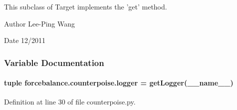 This subclass of Target implements the 'get' method.

\begin{DoxyAuthor}{Author}
Lee-\/\-Ping Wang 
\end{DoxyAuthor}
\begin{DoxyDate}{Date}
12/2011 
\end{DoxyDate}


\subsubsection{Variable Documentation}
\hypertarget{namespaceforcebalance_1_1counterpoise_a9a7008a650c37185e7e43c9b1c943bd6}{
\paragraph[{logger}]{\setlength{\rightskip}{0pt plus 5cm}tuple forcebalance.\-counterpoise.\-logger = get\-Logger(\-\_\-\-\_\-name\-\_\-\-\_\-)}}\label{namespaceforcebalance_1_1counterpoise_a9a7008a650c37185e7e43c9b1c943bd6}


Definition at line 30 of file counterpoise.\-py.

